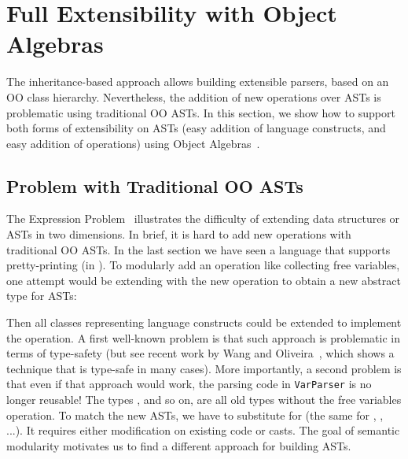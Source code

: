 \section{Full Extensibility with Object Algebras}\label{sec:algebrasandparsing}

The inheritance-based approach allows building extensible parsers, based on an OO class hierarchy.  Nevertheless, the addition of new operations over ASTs is problematic using traditional OO ASTs. In this section, we
show how to support both forms of extensibility on ASTs (easy
addition of language constructs, and easy addition of operations)
using Object Algebras~\cite{Oliveira:2012}.

\subsection{Problem with Traditional OO ASTs}\label{subsec:problemwithoutoa}

The Expression Problem~\cite{wadler1998expression} illustrates the
difficulty of extending data structures or ASTs in two dimensions.
In brief, it is hard to add new operations with traditional OO ASTs.
In the last section we have seen a language
that supports pretty-printing (in ).
To modularly add an operation like collecting free variables, one attempt
would be extending
 with the new operation to obtain a new abstract type
for ASTs:


\noindent Then all classes representing language constructs could be
extended to implement the operation. A first well-known problem is that such
approach is problematic in terms of type-safety (but see recent work
by Wang and Oliveira~\cite{wang2016expression}, which shows a technique that is type-safe
in many cases). More importantly, a second problem is that
even if that approach would work, the parsing code in \lstinline{VarParser} is no longer reusable!
The types , and so on, are all old types without the free variables operation.
To match the new ASTs, we have to substitute  for  (the
same for , , ...). It requires either modification on existing code or casts.
The goal of semantic modularity motivates us to find a different approach for building ASTs.


